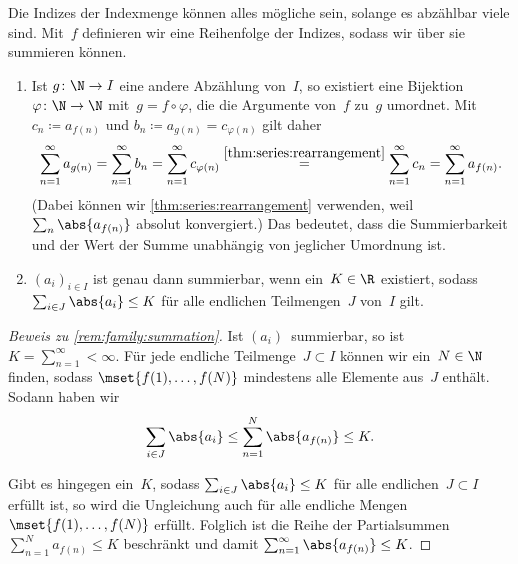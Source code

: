 \documentclass[a4paper]{article}
\begin{document}
Die Indizes der Indexmenge können alles mögliche sein, solange es abzählbar viele sind. Mit~$f$ definieren wir eine Reihenfolge der Indizes, sodass wir über sie summieren können.

\begin{remark}\leavevmode
    \begin{enumerate}
        \item Ist $g\colon \N\to I$ eine andere Abzählung von~$I$, so existiert eine Bijektion~$\varphi\colon \N\to\N$ mit~$g = f\circ\varphi$, die die Argumente von~$f$ zu~$g$ umordnet. Mit~$c_n \coloneqq a_{f(n)}$ und $b_n \coloneqq a_{g(n)} = c_{\varphi(n)}$ gilt daher
              \begin{equation*}
                  \sum_{n=1}^\infty a_{g(n)} = \sum_{n=1}^\infty b_n = \sum_{n=1}^\infty c_{\varphi(n)} \overset{\eqref{thm:series:rearrangement}}{=} \sum_{n=1}^\infty c_n = \sum_{n=1}^\infty a_{f(n)}.
              \end{equation*}
              (Dabei können wir \cref{thm:series:rearrangement} verwenden, weil $\sum_n \abs{a_{f(n)}}$ absolut konvergiert.) Das bedeutet, dass die Summierbarkeit und der Wert der Summe unabhängig von jeglicher Umordnung ist.
        \item $(a_i)_{i\in I}$ ist genau dann summierbar, wenn ein~$K \in \R$ existiert, sodass $\sum_{i\in J} \abs{a_i} \leq K$ für alle endlichen Teilmengen~$J$ von~$I$ gilt.\label{rem:family:summation}
    \end{enumerate}
\end{remark}

\begin{proof}[Beweis zu \cref{rem:family:summation}]
    Ist $(a_i)$~summierbar, so ist $K = \sum_{n=1}^\infty < \infty$. Für jede endliche Teilmenge~$J \subset I$ können wir ein~$N \in \N$ finden, sodass $\mset{f(1),\dots,f(N)}$ mindestens alle Elemente aus~$J$ enthält. Sodann haben wir
    \begin{equation*}
        \sum_{i\in J} \abs{a_i} \leq \sum_{n=1}^N \abs{a_{f(n)}} \leq K.
    \end{equation*}

    Gibt es hingegen ein~$K$, sodass $\sum_{i\in J} \abs{a_i} \leq K$ für alle endlichen~$J \subset I$ erfüllt ist, so wird die Ungleichung auch für alle endliche Mengen $\mset{f(1),\dots,f(N)}$ erfüllt. Folglich ist die Reihe der Partialsummen $\sum_{n=1}^N a_{f(n)} \leq K$ beschränkt und damit $\sum_{n=1}^\infty \abs{a_{f(n)}} \leq K$.
\end{proof}
\end{document}
